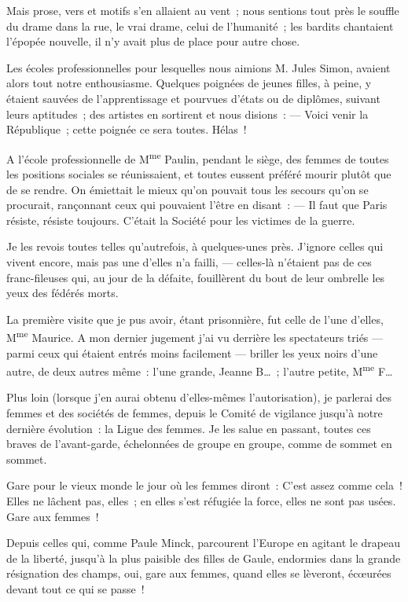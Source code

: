 \documentclass[french,twoside]{book} %
\begin{document}
Mais prose, vers et motifs s’en allaient au vent ; nous sentions tout près le souffle du drame  dans la rue, le vrai drame, celui de l’humanité ; les bardits chantaient l’épopée nouvelle, il n’y avait plus de place pour autre chose.\par
Les écoles professionnelles pour lesquelles nous aimions M. Jules Simon, avaient alors tout notre enthousiasme. Quelques poignées de jeunes filles, à peine, y étaient sauvées de l’apprentissage et pourvues d’états ou de diplômes, suivant leurs aptitudes ; des artistes en sortirent et nous disions : — Voici venir la République ; cette poignée ce sera toutes. Hélas !\par
A l’école professionnelle de M\textsuperscript{me} Paulin, pendant le siège, des femmes de toutes les positions sociales se réunissaient, et toutes eussent préféré mourir plutôt que de se rendre. On émiettait le mieux qu’on pouvait tous les secours qu’on se procurait, rançonnant ceux qui pouvaient l’être en disant : — Il faut que Paris résiste, résiste toujours. C’était la Société pour les victimes de la guerre.\par
Je les revois toutes telles qu’autrefois, à quelques-unes près. J’ignore celles qui vivent encore, mais pas une d’elles n’a failli, — celles-là n’étaient pas de ces franc-fileuses qui, au jour de la défaite, fouillèrent du bout de leur ombrelle les yeux des fédérés morts.\par
La première visite que je pus avoir, étant prisonnière,  fut celle de l’une d’elles, M\textsuperscript{me} Maurice. A mon dernier jugement j’ai vu derrière les spectateurs triés — parmi ceux qui étaient entrés moins facilement — briller les yeux noirs d’une autre, de deux autres même : l’une grande, Jeanne B… ; l’autre petite, M\textsuperscript{me} F…\par
Plus loin (lorsque j’en aurai obtenu d’elles-mêmes l’autorisation), je parlerai des femmes et des sociétés de femmes, depuis le Comité de vigilance jusqu’à notre dernière évolution : la Ligue des femmes. Je les salue en passant, toutes ces braves de l’avant-garde, échelonnées de groupe en groupe, comme de sommet en sommet.\par
Gare pour le vieux monde le jour où les femmes diront : C’est assez comme cela ! Elles ne lâchent pas, elles ; en elles s’est réfugiée la force, elles ne sont pas usées. Gare aux femmes !\par
Depuis celles qui, comme Paule Minck, parcourent l’Europe en agitant le drapeau de la liberté, jusqu’à la plus paisible des filles de Gaule, endormies dans la grande résignation des champs, oui, gare aux femmes, quand elles se lèveront, écœurées devant tout ce qui se passe !\par
\end{document}
